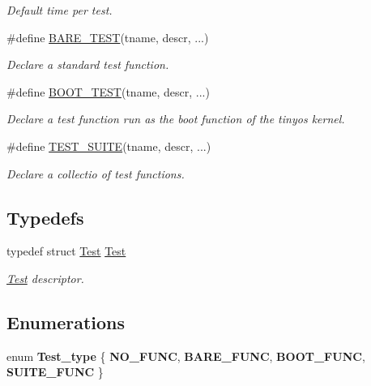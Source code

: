 \begin{DoxyCompactItemize}
\begin{DoxyCompactList}\small\item\em Default time per test. \end{DoxyCompactList}\item 
\#define \hyperlink{group__Testing_gadeb59351f026036674baa906f32ccd5c}{B\+A\+R\+E\+\_\+\+T\+E\+ST}(tname,  descr, ...)
\begin{DoxyCompactList}\small\item\em Declare a standard test function. \end{DoxyCompactList}\item 
\#define \hyperlink{group__Testing_gadaaab439c094503b6ed7c313ad082f10}{B\+O\+O\+T\+\_\+\+T\+E\+ST}(tname,  descr, ...)
\begin{DoxyCompactList}\small\item\em Declare a test function run as the boot function of the tinyos kernel. \end{DoxyCompactList}\item 
\#define \hyperlink{group__Testing_ga3e52396e466caa8cba74e1ae603817d3}{T\+E\+S\+T\+\_\+\+S\+U\+I\+TE}(tname,  descr, ...)
\begin{DoxyCompactList}\small\item\em Declare a collectio of test functions. \end{DoxyCompactList}\end{DoxyCompactItemize}
\subsection*{Typedefs}
\begin{DoxyCompactItemize}
\item 
typedef struct \hyperlink{structTest}{Test} \hyperlink{group__Testing_ga8900225cc98bb7c7fb170b8694e1f7a4}{Test}
\begin{DoxyCompactList}\small\item\em \hyperlink{structTest}{Test} descriptor. \end{DoxyCompactList}\end{DoxyCompactItemize}
\subsection*{Enumerations}
\begin{DoxyCompactItemize}
\item 
\mbox{\label{group__Testing_gae6e489086f229b5c8289c94fba0244fa}} 
enum {\bfseries Test\+\_\+type} \{ {\bfseries N\+O\+\_\+\+F\+U\+NC}, 
{\bfseries B\+A\+R\+E\+\_\+\+F\+U\+NC}, 
{\bfseries B\+O\+O\+T\+\_\+\+F\+U\+NC}, 
{\bfseries S\+U\+I\+T\+E\+\_\+\+F\+U\+NC}
 \}
\end{DoxyCompactItemize}
